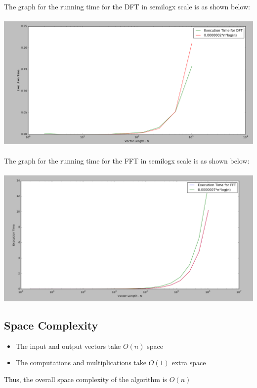 \documentclass{article}
\begin{document}
The graph for the running time for the DFT in semilogx scale is as shown below: \\ \\
\includegraphics[scale=0.3]{logscale-dft} \\ \\
The graph for the running time for the FFT in semilogx scale is as shown below: \\ \\
\includegraphics[scale=0.3]{fft-logscale}

\subsection{Space Complexity}
\begin{itemize}
\item
The input and output vectors take $O(n)$ space
\item
The computations and multiplications take $O(1)$ extra space
\end{itemize}

Thus, the overall space complexity of the algorithm is $O(n)$
\end{document}
